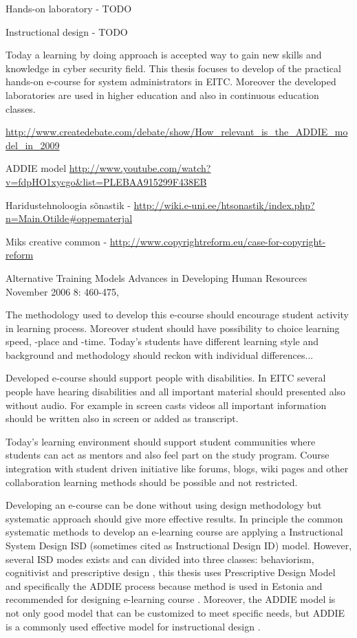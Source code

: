 Hands-on laboratory - {\color{red} TODO }

Instructional design - {\color{red} TODO }

Today a learning by doing approach is accepted way to gain new skills and knowledge in cyber security field. This thesis focuses to develop of the practical hands-on e-course for system administrators in \gls{EITC}. Moreover the developed laboratories are used in higher education and also in continuous education classes.



\url{http://www.createdebate.com/debate/show/How_relevant_is_the_ADDIE_model_in_2009}

ADDIE model \url{http://www.youtube.com/watch?v=fdpHO1xycgo&list=PLEBAA915299F438EB}


Haridustehnoloogia sõnastik - \url{http://wiki.e-uni.ee/htsonastik/index.php?n=Main.Otilde#oppematerjal}

Miks creative common - \url{http://www.copyrightreform.eu/case-for-copyright-reform}

Alternative Training Models
Advances in Developing Human Resources November 2006 8: 460-475,


The methodology used to develop this e-course should encourage student activity in learning process. Moreover student should have possibility to choice learning speed, -place and -time. Today's students have different learning style and background and methodology should reckon with individual differences...

Developed e-course should support people with disabilities. In \gls{EITC} several people have hearing disabilities and all important material should presented also without audio. For example in screen casts videos all important information should be written also in screen or added as transcript.

Today’s learning environment should support student communities where students can act as mentors and also feel part on the study program. Course integration with student driven initiative like forums, blogs, wiki pages and other collaboration learning methods should be possible and not restricted.


Developing an e-course can be done without using design methodology but systematic approach should give more effective results. In principle the common systematic methods to develop an e-learning course are applying a Instructional System Design \gls{ISD} (sometimes cited as  Instructional Design \gls{ID}) model. However, several \gls{ISD} modes exists and can divided into three classes: behaviorism, cognitivist and prescriptive design \citep{website:id_models}, this thesis uses Prescriptive Design Model and specifically the \gls{ADDIE} process because method is used in Estonia and recommended for designing e-learning course \citep[p.~5]{OppeArenduskeskus2010}. Moreover, the \gls{ADDIE} model is not only good model that can be customized to meet specific needs, but ADDIE is a commonly used effective model for instructional  design \citep{ieee_addie_1607206}.


